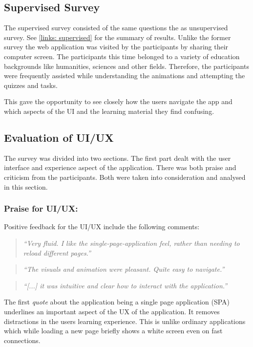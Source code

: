 \subsection{Supervised Survey}
The supervised survey consisted of the same questions the as unsupervised
survey. See \autoref{links: supervised} for the summary of results. Unlike the
former survey the web application was visited by the participants by sharing
their computer screen. The participants  this time belonged
to a variety of education backgrounds like humanities, sciences and other
fields. Therefore, the participants were frequently assisted while understanding
the animations and attempting the quizzes and tasks.

This gave the opportunity to see closely how the users navigate the app and
which aspects of the UI and the learning material they find confusing.


\subsection{Evaluation of UI/UX}
The survey was divided into two sections. The first part dealt with the user interface
and experience aspect of the application. There was both praise and criticism
from the participants. Both were taken into consideration and analysed
in this section.

\subsubsection{Praise for UI/UX:}
Positive feedback for the UI/UX include the following comments:

\begin{quote}
\emph{``Very fluid. I like the single-page-application feel, rather than
needing to reload different pages.''}
\end{quote}

\vspace{0.06 in}
\begin{quote}
\emph{``The visuals and animation were pleasant. Quite easy to navigate.''}
\end{quote}

\vspace{0.06 in}
\begin{quote}
\emph{``[...] it was intuitive and clear how to
interact with the application.''}
\end{quote}


The first \emph{quote} about the application being a single page application
(SPA) underlines an important aspect of the UX of the application.  It removes
distractions in the users learning experience. This is unlike ordinary
applications which while loading a new page briefly shows a white screen even
on fast connections.


